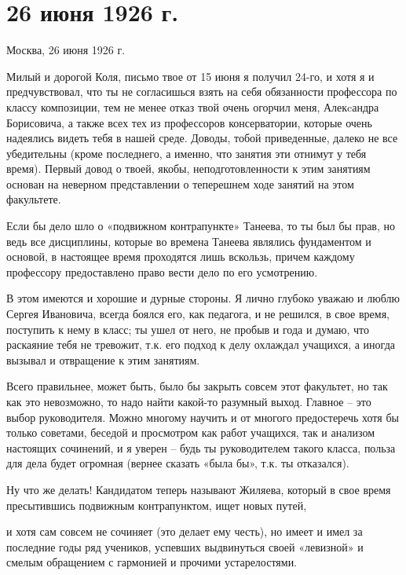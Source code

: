 \section{26 июня 1926 г.}


Москва, 26 июня 1926 г.

Милый и дорогой Коля, письмо твое от 15 июня я получил 24-го, и хотя я и
предчувствовал, что ты не согласишься взять на себя обязанности профессора по
классу композиции, тем не менее отказ твой очень огорчил меня, Алекcандра
Борисовича, а также всех тех из профессоров консерватории, которые очень
надеялись видеть тебя в нашей среде. Доводы, тобой приведенные, далеко не все
убедительны (кроме последнего, а именно, что занятия эти отнимут у тебя время).
Первый довод о твоей, якобы, неподготовленности к этим занятиям основан на
неверном представлении о теперешнем ходе занятий на этом факультете.


Если бы дело шло о «подвижном контрапункте» Танеева, то ты был бы прав, но ведь
все дисциплины, которые во времена Танеева являлись фундаментом и основой, в
настоящее время проходятся лишь вскользь, причем каждому профессору
предоставлено право вести дело по его усмотрению.

В этом имеются и хорошие и дурные стороны. Я лично глубоко уважаю и люблю
Сергея Ивановича, всегда боялся его, как педагога, и не решился, в свое время,
поступить к нему в класс; ты ушел от него, не пробыв и года и думаю, что
раскаяние тебя не тревожит, т.к. его подход к делу охлаждал учащихся, а иногда
вызывал и отвращение к этим занятиям.


Всего правильнее, может быть, было бы закрыть совсем этот факультет, но так как
это невозможно, то надо найти какой-то разумный выход. Главное -- это выбор
руководителя. Можно многому научить и от многого предостеречь хотя бы только
советами, беседой и просмотром как работ учащихся, так и анализом настоящих
сочинений, и я уверен -- будь ты руководителем такого класса, польза для дела
будет огромная (вернее сказать «была бы», т.к. ты отказался).

Ну что же делать! Кандидатом теперь называют Жиляева, который в свое время
пресытившись подвижным контрапунктом, ищет новых путей,


\noindent
и хотя сам совсем не сочиняет (это делает ему честь), но имеет и имел за
последние годы ряд учеников, успевших выдвинуться своей «левизной» и смелым
обращением с гармонией и прочими устарелостями.

